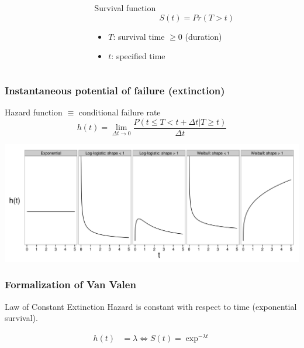 \documentclass{beamer}
\begin{document}
\begin{frame}
\begin{columns}
\begin{column}{0.5\textwidth}
      \tiny{}
    \end{column}
    \begin{column}{0.5\textwidth}
      \begin{block}{Survival function}
        \[
          S(t) = Pr(T > t)
        \]

        \begin{itemize}
          \item \(T\): survival time \(\geq 0\) (duration)
          \item \(t\): specified time 
        \end{itemize}
      \end{block}
    \end{column}
  \end{columns}
\end{frame}

\begin{frame}
  \frametitle{Instantaneous potential of failure (extinction)}

  \begin{block}{Hazard function \(\equiv\) conditional failure rate}
    \[
      h(t) = \lim_{\Delta t \to 0} \frac{P(t \leq T < t + \Delta t | T \geq t)}{\Delta t}
    \]
  \end{block}

  \begin{center}
    \includegraphics[height = 0.5\textheight, width = \textwidth, keepaspectratio = true]{figure/hazard}
  \end{center}
\end{frame}

\begin{frame}
  \frametitle{Formalization of Van Valen}

  \begin{block}{Law of Constant Extinction}
    Hazard is constant with respect to time (\alert{exponential survival}).
  \end{block}

    \begin{align*}
      h(t) &= \lambda \iff S(t) = \exp^{-\lambda t}
    \end{align*}
\end{frame}
\end{document}
